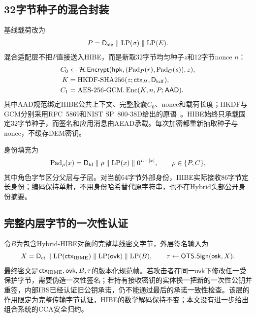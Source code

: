 \documentclass[UTF8,a4paper,12pt,oneside,openany,fontset=fandol]{ctexrep}
\begin{document}
\subsection{32字节种子的混合封装}
基线载荷改为
\[
 P=\mathsf D_{\rm sig}\parallel\mathrm{LP}(\sigma)\parallel\mathrm{LP}(E).
\]
混合适配层不把\(P\)直接送入HIBE，而是新取32字节均匀种子\(z\)和12字节nonce \(n\)：
\begin{align*}
 C_0&\leftarrow\mathcal H.\mathsf{Encrypt}
   (\mathsf{hpk},(\operatorname{Pad}_P(r),\operatorname{Pad}_C(s)),z),\\
 K&=\operatorname{HKDF\text{-}SHA256}
   (z;\mathsf{ctx}_H,\mathsf D_{\rm kdf}),\\
 C_1&=\operatorname{AES\text{-}256\text{-}GCM.Enc}
   (K,n,P;\mathsf{AAD}).
\end{align*}
其中AAD规范绑定HIBE公共上下文、完整胶囊\(C_0\)、nonce和载荷长度；HKDF与GCM分别采用RFC~5869和NIST SP~800-38D给出的原语~\cite{rfc5869,nist2007gcm}。HIBE始终只承载固定32字节种子，而签名和应用消息由AEAD承载。每次加密都重新抽取种子与nonce，不缓存DEM密钥。

身份填充为
\[
 \operatorname{Pad}_{\rho}(x)=\mathsf D_{\rm id}\parallel\rho
   \parallel\mathrm{LP}(x)\parallel 0^{L-|x|},
 \qquad \rho\in\{P,C\},
\]
其中角色字节区分父层与子层。对当前64字节外部身份，HIBE实际接收86字节定长身份；编码保持单射，不用身份哈希替代原字符串，也不在Hybrid头部公开身份摘要。

\subsection{完整内层字节的一次性认证}
令\(B\)为包含Hybrid-HIBE对象的完整基线密文字节，外层签名输入为
\[
 X=\mathsf D_{\rm ct}\parallel\mathrm{LP}(\mathsf{ctx}_{\rm IBME})
   \parallel\mathrm{LP}(\mathsf{ovk})\parallel\mathrm{LP}(B),
 \qquad \tau\leftarrow\mathsf{OTS.Sign}(\mathsf{osk},X).
\]
最终密文是\(\mathsf{ctx}_{\rm IBME},\mathsf{ovk},B,\tau\)的版本化规范帧。若攻击者在同一\(\mathsf{ovk}\)下修改任一受保护字节，需要伪造一次性签名；若持有接收密钥的实体换一把新的一次性公钥并重签，内部IBS已经认证旧公钥承诺，仍不能通过最后的承诺一致性检查。该层的作用限定为完整传输字节认证，HIBE的数学解码保持不变；本文没有进一步给出组合系统的CCA安全归约。
\end{document}
